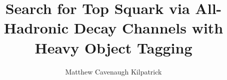 \documentclass[12pt]{ruthesis}
\title{Search for Top Squark via All-Hadronic Decay Channels with Heavy Object Tagging}
\author{Matthew Cavenaugh Kilpatrick}
\begin{document}
  \begin{frontmatter}
   \maketitle
   
   \tableofcontents
   \listoffigures
   \listoftables
%   
  \end{frontmatter}






%



\appendix

%
%
%
%


%
\end{document}
